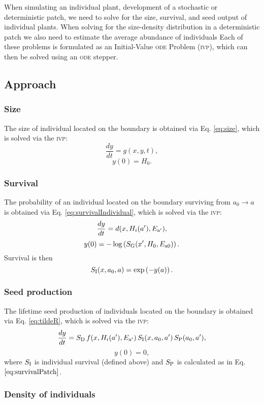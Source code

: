 \documentclass[10pt,twoside]{article}
\begin{document}
When simulating an individual plant, development of a stochastic or
deterministic patch, we need to solve for the size, survival, and seed
output of individual plants. When solving for the size-density distribution
in a deterministic patch we also need to estimate the average abundance of individuals
Each of these problems is formulated as an Initial-Value \textsc{ode} Problem
(\textsc{ivp}), which can then be solved using an \textsc{ode} stepper.

\subsection{Approach}

\subsubsection{Size}\label{size}

The size of individual located on the boundary is obtained via Eq.
\ref{eq:size}, which is solved via the \textsc{ivp}:
\[\frac{dy}{dt} = g(x, y, t) ,\] \[ y(0) = H_0.\]

\subsubsection{Survival}\label{survival}

The probability of an individual located on the boundary surviving from
\(a_0 \rightarrow a\) is obtained via Eq. \ref{eq:survivalIndividual},
which is solved via the \textsc{ivp}:
\[\frac{dy}{dt} = d(x, H_i(a^\prime) , E_{\rm a^\prime}),\]
\[ y(0) = - \log\left(S_{\rm G} (x^\prime, H_0, E_{{\rm a}0})\right) .\]
Survival is then \[ S_{\rm I} (x, a_0, a) = \exp\left( - y(a) \right).\]

\subsubsection{Seed production}\label{seed-production}

The lifetime seed production of individuals located on the boundary is
obtained via Eq. \ref{eq:tildeR}, which is solved via the \textsc{ivp}:
\[\frac{dy}{dt} = S_{\rm D} \, f(x, H_i(a^\prime), E_{\rm a^\prime}) \, S_{\rm I} (x, a_0, a^\prime) \, S_{\rm P} (a_0, a^\prime),\]
\[ y(0) = 0,\] where \(S_{\rm I}\) is individual survival (defined
above) and \(S_{\rm P}\) is calculated as in Eq.
\(\ref{eq:survivalPatch}\).

\subsubsection{Density of individuals}\label{density-of-individuals}
\end{document}
